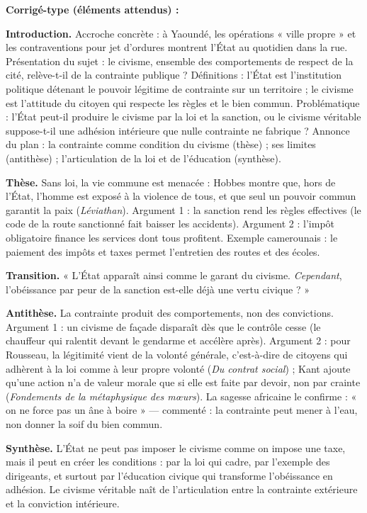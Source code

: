 \documentclass[11pt]{article}
\newcommand{\cle}[1]{{\popxbold\color{popdark}#1}}
\begin{document}
\begin{corrige}
\textbf{Corrigé-type (éléments attendus) :}

\textbf{Introduction.} Accroche concrète : à Yaoundé, les opérations « ville propre » et les contraventions pour jet d'ordures montrent l'État au quotidien dans la rue. Présentation du sujet : le civisme, ensemble des comportements de respect de la cité, relève-t-il de la contrainte publique ? Définitions : l'\cle{État} est l'institution politique détenant le pouvoir légitime de contrainte sur un territoire ; le \cle{civisme} est l'attitude du citoyen qui respecte les règles et le bien commun. Problématique : l'État peut-il produire le civisme par la loi et la sanction, ou le civisme véritable suppose-t-il une adhésion intérieure que nulle contrainte ne fabrique ? Annonce du plan : la contrainte comme condition du civisme (thèse) ; ses limites (antithèse) ; l'articulation de la loi et de l'éducation (synthèse).

\textbf{Thèse.} Sans loi, la vie commune est menacée : Hobbes montre que, hors de l'État, l'homme est exposé à la violence de tous, et que seul un pouvoir commun garantit la paix (\emph{Léviathan}). Argument 1 : la sanction rend les règles effectives (le code de la route sanctionné fait baisser les accidents). Argument 2 : l'impôt obligatoire finance les services dont tous profitent. Exemple camerounais : le paiement des impôts et taxes permet l'entretien des routes et des écoles.

\textbf{Transition.} « L'État apparaît ainsi comme le garant du civisme. \emph{Cependant}, l'obéissance par peur de la sanction est-elle déjà une vertu civique ? »

\textbf{Antithèse.} La contrainte produit des comportements, non des convictions. Argument 1 : un civisme de façade disparaît dès que le contrôle cesse (le chauffeur qui ralentit devant le gendarme et accélère après). Argument 2 : pour Rousseau, la légitimité vient de la volonté générale, c'est-à-dire de citoyens qui adhèrent à la loi comme à leur propre volonté (\emph{Du contrat social}) ; Kant ajoute qu'une action n'a de valeur morale que si elle est faite par devoir, non par crainte (\emph{Fondements de la métaphysique des mœurs}). La sagesse africaine le confirme : « on ne force pas un âne à boire » — commenté : la contrainte peut mener à l'eau, non donner la soif du bien commun.

\textbf{Synthèse.} L'État ne peut pas imposer le civisme comme on impose une taxe, mais il peut en créer les conditions : par la loi qui cadre, par l'exemple des dirigeants, et surtout par l'éducation civique qui transforme l'obéissance en adhésion. Le civisme véritable naît de l'articulation entre la contrainte extérieure et la conviction intérieure.


\end{corrige}
\end{document}
